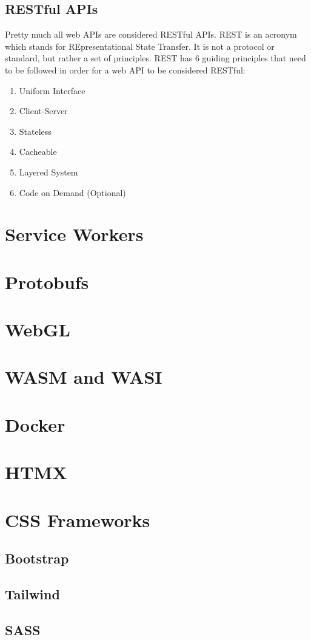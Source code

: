 \documentclass{article}
\begin{document}
\subsection{RESTful APIs}

Pretty much all web APIs are considered RESTful APIs. REST is an acronym which stands for REpresentational
State Transfer. It is not a protocol or standard, but rather a set of principles. REST has 6 guiding principles
that need to be followed in order for a web API to be considered RESTful:

\begin{enumerate}

\item Uniform Interface

\item Client-Server

\item Stateless

\item Cacheable

\item Layered System

\item Code on Demand (Optional)

\end{enumerate}

\section{Service Workers}

\section{Protobufs}

\section{WebGL}

\section{WASM and WASI}

\section{Docker}

\section{HTMX}

\section{CSS Frameworks}

\subsection{Bootstrap}

\subsection{Tailwind}

\subsection{SASS}
\end{document}
